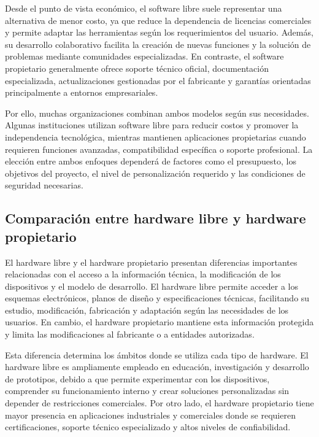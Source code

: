 \documentclass[12pt]{article}
\begin{document}
	Desde el punto de vista económico, el software libre suele representar una alternativa de menor costo, ya que reduce la dependencia de licencias comerciales y permite adaptar las herramientas según los requerimientos del usuario. Además, su desarrollo colaborativo facilita la creación de nuevas funciones y la solución de problemas mediante comunidades especializadas. En contraste, el software propietario generalmente ofrece soporte técnico oficial, documentación especializada, actualizaciones gestionadas por el fabricante y garantías orientadas principalmente a entornos empresariales.
	
	Por ello, muchas organizaciones combinan ambos modelos según sus necesidades. Algunas instituciones utilizan software libre para reducir costos y promover la independencia tecnológica, mientras mantienen aplicaciones propietarias cuando requieren funciones avanzadas, compatibilidad específica o soporte profesional. La elección entre ambos enfoques dependerá de factores como el presupuesto, los objetivos del proyecto, el nivel de personalización requerido y las condiciones de seguridad necesarias.
	
	
	\subsection{Comparación entre hardware libre y hardware propietario}
	
	El hardware libre y el hardware propietario presentan diferencias importantes relacionadas con el acceso a la información técnica, la modificación de los dispositivos y el modelo de desarrollo. El hardware libre permite acceder a los esquemas electrónicos, planos de diseño y especificaciones técnicas, facilitando su estudio, modificación, fabricación y adaptación según las necesidades de los usuarios. En cambio, el hardware propietario mantiene esta información protegida y limita las modificaciones al fabricante o a entidades autorizadas.
	
	Esta diferencia determina los ámbitos donde se utiliza cada tipo de hardware. El hardware libre es ampliamente empleado en educación, investigación y desarrollo de prototipos, debido a que permite experimentar con los dispositivos, comprender su funcionamiento interno y crear soluciones personalizadas sin depender de restricciones comerciales. Por otro lado, el hardware propietario tiene mayor presencia en aplicaciones industriales y comerciales donde se requieren certificaciones, soporte técnico especializado y altos niveles de confiabilidad.
	
\end{document}
